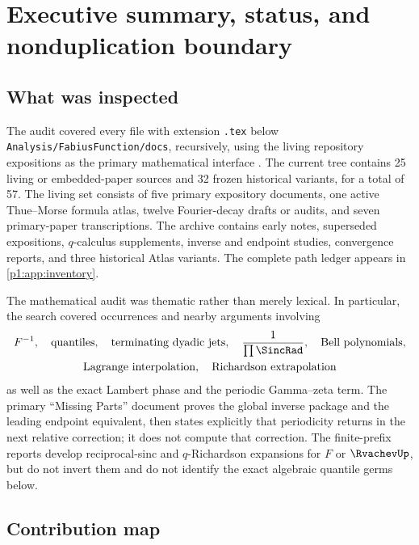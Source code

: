 \documentclass[11pt,oneside]{article}
\numberwithin{equation}{section}
\theoremstyle{definition}
\theoremstyle{remark}
\newcommand{\repo}{\nolinkurl{Analysis/FabiusFunction/docs}}
\begin{document}
\newpage

\section{Executive summary, status, and nonduplication boundary}
\label{p1:sec:executive}

\subsection{What was inspected}

The audit covered every file with extension \texttt{.tex} below \repo{}, recursively, using the living repository expositions as the primary mathematical interface \cite{p1:ProveItPrimary,p1:ProveItMissing,p1:ProveItAtlas,p1:ProveItFrontiers}.
The current tree contains 25 living or embedded-paper sources and 32 frozen historical
variants, for a total of 57.  The living set consists of five primary expository documents,
one active Thue--Morse formula atlas, twelve Fourier-decay drafts or audits, and seven
primary-paper transcriptions.  The archive contains early notes, superseded expositions,
$q$-calculus supplements, inverse and endpoint studies, convergence reports, and three
historical Atlas variants.  The complete path ledger appears in \cref{p1:app:inventory}.

The mathematical audit was thematic rather than merely lexical.  In particular, the search
covered occurrences and nearby arguments involving
\[
 \begin{gathered}
 F^{-1},\quad \text{quantiles},\quad \text{terminating dyadic jets},\quad
 \frac1{\prod\SincRad},\quad \text{Bell polynomials},\\
 \text{Lagrange interpolation},\quad \text{Richardson extrapolation}
 \end{gathered}
\]
as well as the exact Lambert phase and the periodic Gamma--zeta term.  The primary
``Missing Parts'' document proves the global inverse package and the leading endpoint
equivalent, then states explicitly that periodicity returns in the next relative correction;
it does not compute that correction.  The finite-prefix reports develop reciprocal-sinc and
$q$-Richardson expansions for $F$ or $\RvachevUp$, but do not invert them and do not identify the
exact algebraic quantile germs below.

\subsection{Contribution map}
\end{document}
